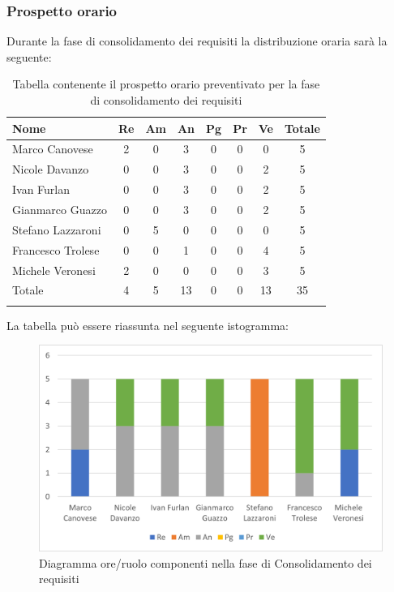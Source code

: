             \subsubsection{Prospetto orario}
			Durante la fase di consolidamento dei requisiti la distribuzione oraria sarà la seguente:
			
			\begin{longtable}{|l|c|c|c|c|c|c|c|}
				\hline
				\rowcolor{lighter-grayer}
				\textbf{Nome} & \textbf{Re} & \textbf{Am} & \textbf{An} & \textbf{Pg}  & \textbf{Pr}   & \textbf{Ve} & \textbf{Totale} \\
				\hline
				\endfirsthead
				
				\hline
				Marco Canovese & 2 & 0 & 3 & 0 & 0 & 0 & 5\\
				\hline
				\hline
				Nicole Davanzo & 0 & 0 & 3 & 0 & 0 & 2 & 5\\
				\hline
				\hline
				Ivan Furlan & 0 & 0 & 3 & 0 & 0 & 2 & 5\\
				\hline
				\hline
				Gianmarco Guazzo & 0 & 0 & 3 & 0 & 0 & 2 & 5\\
				\hline
				\hline
				Stefano Lazzaroni & 0 & 5 & 0 & 0 & 0 & 0 & 5\\
				\hline
				\hline
				Francesco Trolese & 0 & 0 & 1 & 0 & 0 & 4 & 5\\
				\hline
				\hline
				Michele Veronesi & 2 & 0 & 0 & 0 & 0 & 3 & 5\\
				\hline 
				\hline
				Totale & 4 & 5 & 13 & 0 & 0 & 13 & 35\\
				\hline 
				\rowcolor{white}
				\caption{Tabella contenente il prospetto orario preventivato per la fase di consolidamento dei requisiti}
			\end{longtable}

		
			La tabella può essere riassunta nel seguente istogramma:
		
			\begin{figure}[H]
				\centering
				\includegraphics[width=0.8\linewidth]{res/images/preventivo/2-1.png}
				\caption{Diagramma ore/ruolo componenti nella fase di Consolidamento dei requisiti}
				\label{fig:diagramma suddivisione ruoli fase conslidamento dei requisiti}
			\end{figure}
		
